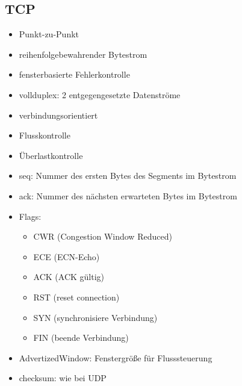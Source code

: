 \subsection{TCP}
\begin{itemize}
	\item Punkt-zu-Punkt
	\item reihenfolgebewahrender Bytestrom
	\item fensterbasierte Fehlerkontrolle
	\item vollduplex: 2 entgegengesetzte Datenströme
	\item verbindungsorientiert
	\item Flusskontrolle
	\item Überlastkontrolle
\end{itemize}
\begin{multicols}{2}
\begin{itemize}
	\item seq: Nummer des ersten Bytes des Segments im Bytestrom
	\item ack: Nummer des nächsten erwarteten Bytes im Bytestrom
	\item Flags:
		\begin{itemize}
			\item CWR (Congestion Window Reduced)
			\item ECE (ECN-Echo)
			\item ACK (ACK gültig)
			\item RST (reset connection)
			\item SYN (synchronisiere Verbindung)
			\item FIN (beende Verbindung)
		\end{itemize}
	\item AdvertizedWindow: Fenstergröße für Flusssteuerung
	\item checksum: wie bei UDP
	\begin{center}

\end{center}
\end{itemize}
\end{multicols}
